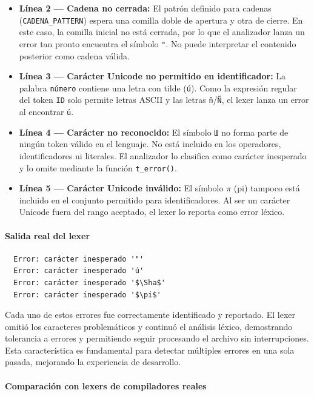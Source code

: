 \documentclass{article}
\begin{document}
\begin{itemize}
  \item \textbf{Línea 2 — Cadena no cerrada:} El patrón definido para cadenas (\texttt{CADENA\_PATTERN}) espera una comilla doble de apertura y otra de cierre. En este caso, la comilla inicial no está cerrada, por lo que el analizador lanza un error tan pronto encuentra el símbolo \texttt{"}. No puede interpretar el contenido posterior como cadena válida.

  \item \textbf{Línea 3 — Carácter Unicode no permitido en identificador:} La palabra \texttt{número} contiene una letra con tilde (\texttt{ú}). Como la expresión regular del token \texttt{ID} solo permite letras ASCII y las letras \texttt{ñ}/\texttt{Ñ}, el lexer lanza un error al encontrar \texttt{ú}.

  \item \textbf{Línea 4 — Carácter no reconocido:} El símbolo \texttt{Ш} no forma parte de ningún token válido en el 
  lenguaje. No está incluido en los operadores, identificadores ni literales. El analizador lo clasifica como carácter inesperado y 
  lo omite mediante la función \texttt{t\_error()}.

  \item \textbf{Línea 5 — Carácter Unicode inválido:} El símbolo \texttt{$\pi$} (pi) tampoco está incluido en el conjunto permitido para identificadores. Al ser un carácter Unicode fuera del rango aceptado, el lexer lo reporta como error léxico.
\end{itemize}

\paragraph{Salida real del lexer}

\begin{Verbatim}
  Error: carácter inesperado '"'
  Error: carácter inesperado 'ú'
  Error: carácter inesperado '$\Sha$'
  Error: carácter inesperado '$\pi$'
\end{Verbatim}

Cada uno de estos errores fue correctamente identificado y reportado. El lexer omitió los caracteres problemáticos y continuó el análisis léxico, demostrando tolerancia a errores y permitiendo seguir procesando el archivo sin interrupciones. Esta característica es fundamental para detectar múltiples errores en una sola pasada, mejorando la experiencia de desarrollo.

\paragraph{Comparación con lexers de compiladores reales}
\end{document}
